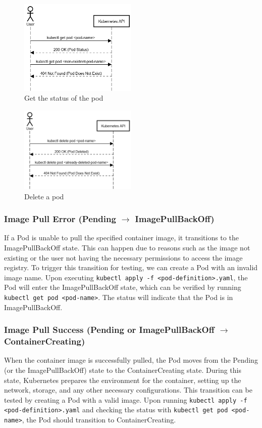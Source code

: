 \documentclass[main.tex]{subfiles}
\begin{document}
\begin{figure}[H]
    \centering
    \includegraphics[width=0.5\textwidth]{../uml_seq_diagrams/kubectl_get_pod.png}
    \caption{Get the status of the pod}
    \label{fig:get_pod_diagram}
\end{figure}

\begin{figure}[H]
    \centering
    \includegraphics[width=0.5\textwidth]{../uml_seq_diagrams/kubectl_delete.png}
    \caption{Delete a pod}
    \label{fig:delete_pod_diagram}
\end{figure}


\subsubsection{Image Pull Error (Pending $\rightarrow$ ImagePullBackOff)}
If a Pod is unable to pull the specified container image, it transitions to the ImagePullBackOff state. This can happen due to reasons such as the image not existing or the user not having the necessary permissions to access the image registry. To trigger this transition for testing, we can create a Pod with an invalid image name. Upon executing \texttt{kubectl apply -f <pod-definition>.yaml}, the Pod will enter the ImagePullBackOff state, which can be verified by running \texttt{kubectl get pod <pod-name>}. The status will indicate that the Pod is in ImagePullBackOff.

\subsubsection{Image Pull Success (Pending or ImagePullBackOff $\rightarrow$ ContainerCreating)}
When the container image is successfully pulled, the Pod moves from the Pending (or the ImagePullBackOff) state to the ContainerCreating state. During this state, Kubernetes prepares the environment for the container, setting up the network, storage, and any other necessary configurations. This transition can be tested by creating a Pod with a valid image. Upon running \texttt{kubectl apply -f <pod-definition>.yaml} and checking the status with \texttt{kubectl get pod <pod-name>}, the Pod should transition to ContainerCreating.
\end{document}
